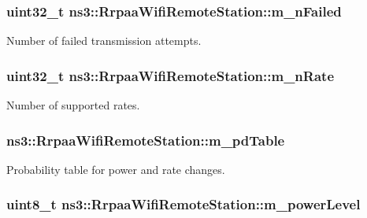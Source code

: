 \subsubsection[{\texorpdfstring{m\+\_\+n\+Failed}{m_nFailed}}]{\setlength{\rightskip}{0pt plus 5cm}uint32\+\_\+t ns3\+::\+Rrpaa\+Wifi\+Remote\+Station\+::m\+\_\+n\+Failed}\hypertarget{structns3_1_1RrpaaWifiRemoteStation_a52227d8a1993fc867118cd2728ac2cd2}{}\label{structns3_1_1RrpaaWifiRemoteStation_a52227d8a1993fc867118cd2728ac2cd2}


Number of failed transmission attempts. 

\subsubsection[{\texorpdfstring{m\+\_\+n\+Rate}{m_nRate}}]{\setlength{\rightskip}{0pt plus 5cm}uint32\+\_\+t ns3\+::\+Rrpaa\+Wifi\+Remote\+Station\+::m\+\_\+n\+Rate}\hypertarget{structns3_1_1RrpaaWifiRemoteStation_afd24ca662ce9d0a0a646cd455b801a54}{}\label{structns3_1_1RrpaaWifiRemoteStation_afd24ca662ce9d0a0a646cd455b801a54}


Number of supported rates. 

\subsubsection[{\texorpdfstring{m\+\_\+pd\+Table}{m_pdTable}}]{ ns3\+::\+Rrpaa\+Wifi\+Remote\+Station\+::m\+\_\+pd\+Table}\hypertarget{structns3_1_1RrpaaWifiRemoteStation_ae520e6c006b1d0854d476a8b4cdd3208}{}\label{structns3_1_1RrpaaWifiRemoteStation_ae520e6c006b1d0854d476a8b4cdd3208}


Probability table for power and rate changes. 

\subsubsection[{\texorpdfstring{m\+\_\+power\+Level}{m_powerLevel}}]{\setlength{\rightskip}{0pt plus 5cm}uint8\+\_\+t ns3\+::\+Rrpaa\+Wifi\+Remote\+Station\+::m\+\_\+power\+Level}\hypertarget{structns3_1_1RrpaaWifiRemoteStation_ad02728c1a6691acc74844587468f95b4}{}\label{structns3_1_1RrpaaWifiRemoteStation_ad02728c1a6691acc74844587468f95b4}


